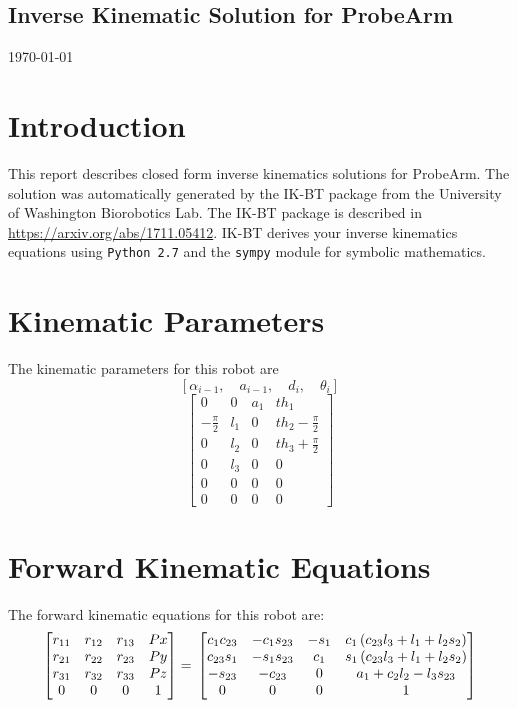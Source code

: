 
    \begin{center}
    \section*{Inverse Kinematic Solution for ProbeArm}
    \today
    \end{center}
    \section{Introduction}
    This report describes closed form inverse kinematics solutions for ProbeArm.
    The solution was automatically generated by the IK-BT package from the University of Washington Biorobotics Lab.
    The IK-BT package is described in
    \url{https://arxiv.org/abs/1711.05412}.  IK-BT derives your inverse kinematics equations
    using {\tt Python 2.7} and the {\tt sympy} module for symbolic mathematics.
    
\section{Kinematic Parameters}
    The kinematic parameters for this robot are
    \[ \left [ \alpha_{i-1}, \quad a_{i-1}, \quad d_i, \quad \theta_i \right  ] \]
    \begin{dmath} \left[\begin{matrix}0 & 0 & a_{1} & th_{1}\\- \frac{\pi}{2} & l_{1} & 0 & th_{2} - \frac{\pi}{2}\\0 & l_{2} & 0 & th_{3} + \frac{\pi}{2}\\0 & l_{3} & 0 & 0\\0 & 0 & 0 & 0\\0 & 0 & 0 & 0\end{matrix}\right] \end{dmath}
    
\section{Forward Kinematic Equations}
    The forward kinematic equations for this robot are:
\begin{dmath}
\left[\begin{matrix}r_{11} & r_{12} & r_{13} & Px\\r_{21} & r_{22} & r_{23} & Py\\r_{31} & r_{32} & r_{33} & Pz\\0 & 0 & 0 & 1\end{matrix}\right] =  \\
\left[\begin{matrix}c_{1} c_{23} & - c_{1} s_{23} & - s_{1} & c_{1} \left(c_{23} l_{3} + l_{1} + l_{2} s_{2}\right)\\c_{23} s_{1} & - s_{1} s_{23} & c_{1} & s_{1} \left(c_{23} l_{3} + l_{1} + l_{2} s_{2}\right)\\- s_{23} & - c_{23} & 0 & a_{1} + c_{2} l_{2} - l_{3} s_{23}\\0 & 0 & 0 & 1\end{matrix}\right]
\end{dmath}
